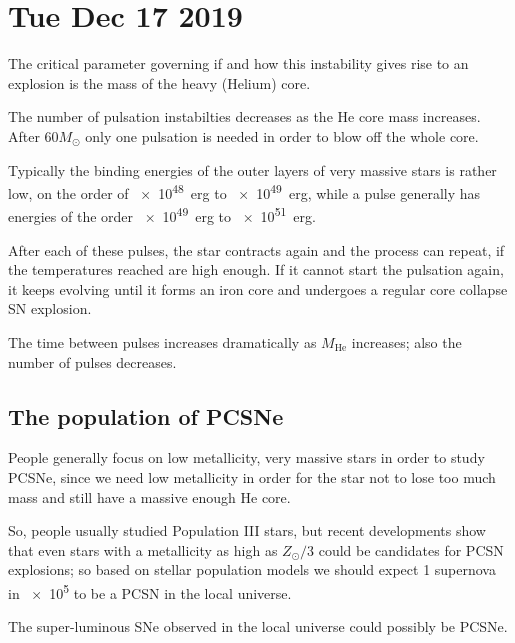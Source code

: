 \documentclass[main.tex]{subfiles}
\begin{document}
\section*{Tue Dec 17 2019}


The critical parameter governing if and how this instability gives rise to an explosion is the mass of the heavy (Helium) core.

The number of pulsation instabilties decreases as the He core mass increases.
After \(60 M_{\odot}\) only one pulsation is needed in order to blow off the whole core.

Typically the binding energies of the outer layers of very massive stars is rather low, on the order of \SI{e48}{erg} to \SI{e49}{erg}, while a pulse generally has energies of the order \SI{e49}{erg} to \SI{e51}{erg}. 

After each of these pulses, the star contracts again and the process can repeat, if the temperatures reached are high enough.
If it cannot start the pulsation again, it keeps evolving until it forms an iron core and undergoes a regular core collapse SN explosion.

The time between pulses increases dramatically as \(M _{\text{He}}\) increases; also the number of pulses decreases.

\subsection{The population of PCSNe}

People generally focus on low metallicity, very massive stars in order to study PCSNe, since we need low metallicity in order for the star not to lose too much mass and still have a massive enough He core.

So, people usually studied Population III stars, but recent developments show that even stars with a metallicity as high as \(Z_{\odot} / 3\) could be candidates for PCSN explosions; so based on stellar population models we should expect 1 supernova in \num{e5} to be a PCSN in the local universe.

The super-luminous SNe observed in the local universe could possibly be PCSNe.
\end{document}

